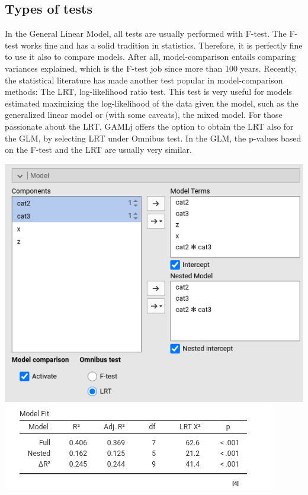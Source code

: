 \documentclass[
]{book}
\begin{document}
\hypertarget{types-of-tests}{%
\subsection{Types of tests}\label{types-of-tests}}

In the General Linear Model, all tests are usually performed with F-test. The F-test works fine and has a solid tradition in statistics. Therefore, it is perfectly fine to use it also to compare models. After all, model-comparison entails comparing variances explained, which is the F-test job since more than 100 years. Recently, the statistical literature has made another test popular in model-comparison methods: The LRT, log-likelihood ratio test. This test is very useful for models estimated maximizing the log-likelihood of the data given the model, such as the generalized linear model or (with some caveats), the mixed model. For those passionate about the LRT, {GAMLj} offers the option to obtain the LRT also for the GLM, by selecting {LRT} under {Omnibus test}. In the GLM, the p-values based on the F-test and the LRT are usually very similar.

\includegraphics{bookletpics/2_modelcomparison_input3.png}
\includegraphics{bookletpics/2_modelcomparison_output3.png}
\end{document}
